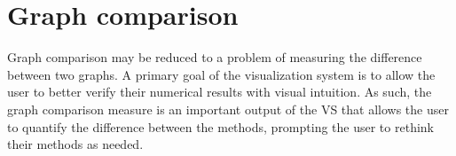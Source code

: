 \chapter{Graph comparison \label{ch:gc}}

Graph comparison may be reduced to a problem of measuring the difference 
between two graphs. 
A primary goal of the visualization system is to allow the user to better 
verify their numerical results with visual intuition. As such, the graph 
comparison measure is an important output of the VS that allows the user to 
quantify the difference between the methods, prompting the user to rethink 
their methods as needed.



